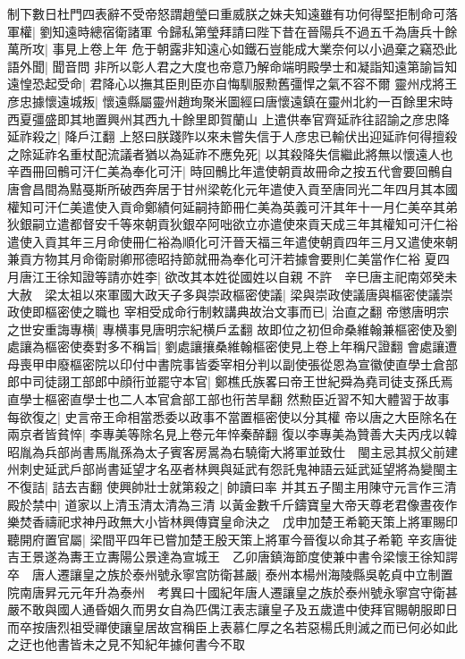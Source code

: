 制下數日杜門四表辭不受帝怒謂趙瑩曰重威朕之妹夫知遠雖有功何得堅拒制命可落軍權|{
	劉知遠時總宿衛諸軍}
令歸私第瑩拜請曰陛下昔在晉陽兵不過五千為唐兵十餘萬所攻|{
	事見上卷上年}
危于朝露非知遠心如鐵石豈能成大業奈何以小過棄之竊恐此語外聞|{
	聞音問}
非所以彰人君之大度也帝意乃解命端明殿學士和凝詣知遠第諭旨知遠惶恐起受命|{
	君降心以撫其臣則臣亦自悔馴服勲舊彊悍之氣不容不爾}
靈州戍將王彦忠據懷遠城叛|{
	懷遠縣屬靈州趙珣聚米圖經曰唐懷遠鎮在靈州北約一百餘里宋時西夏彊盛即其地置興州其西九十餘里即賀蘭山}
上遣供奉官齊延祚往詔諭之彦忠降延祚殺之|{
	降戶江翻}
上怒曰朕踐阼以來未嘗失信于人彦忠已輸伏出迎延祚何得擅殺之除延祚名重杖配流議者猶以為延祚不應免死|{
	以其殺降失信繼此將無以懷遠人也}
辛酉冊回鶻可汗仁美為奉化可汗|{
	時回鶻比年遣使朝貢故冊命之按五代會要回鶻自唐會昌間為黠戞斯所破西奔居于甘州梁乾化元年遣使入貢至唐同光二年四月其本國權知可汗仁美遣使入貢命鄭績何延嗣持節冊仁美為英義可汗其年十一月仁美卒其弟狄銀嗣立遣都督安千等來朝貢狄銀卒阿咄欲立亦遣使來貢天成三年其權知可汗仁裕遣使入貢其年三月命使冊仁裕為順化可汗晉天福三年遣使朝貢四年三月又遣使來朝兼貢方物其月命衛尉卿邢德昭持節就冊為奉化可汗若據會要則仁美當作仁裕}
夏四月唐江王徐知證等請亦姓李|{
	欲改其本姓從國姓以自親}
不許　辛巳唐主祀南郊癸未大赦　梁太祖以來軍國大政天子多與崇政樞密使議|{
	梁與崇政使議唐與樞密使議崇政使即樞密使之職也}
宰相受成命行制敕講典故治文事而已|{
	治直之翻}
帝懲唐明宗之世安重誨專横|{
	專横事見唐明宗紀横戶孟翻}
故即位之初但命桑維翰兼樞密使及劉處讓為樞密使奏對多不稱旨|{
	劉處讓攘桑維翰樞密使見上卷上年稱尺證翻}
會處讓遭母喪甲申廢樞密院以印付中書院事皆委宰相分判以副使張從恩為宣徽使直學士倉部郎中司徒詡工部郎中顔衎並罷守本官|{
	鄭樵氏族畧曰帝王世紀舜為堯司徒支孫氏焉直學士樞密直學士也二人本官倉部工部也衎苦旱翻}
然勲臣近習不知大體習于故事每欲復之|{
	史言帝王命相當悉委以政事不當置樞密使以分其權}
帝以唐之大臣除名在兩京者皆貧悴|{
	李專美等除名見上卷元年悴秦醉翻}
復以李專美為贊善大夫丙戌以韓昭胤為兵部尚書馬胤孫為太子賓客房暠為右驍衛大將軍並致仕　閩主忌其叔父前建州刺史延武戶部尚書延望才名巫者林興與延武有怨託鬼神語云延武延望將為變閩主不復詰|{
	詰去吉翻}
使興帥壯士就第殺之|{
	帥讀曰率}
并其五子閩主用陳守元言作三清殿於禁中|{
	道家以上清玉清太清為三清}
以黃金數千斤鑄寶皇大帝天尊老君像晝夜作樂焚香禱祀求神丹政無大小皆林興傳寶皇命決之　戊申加楚王希範天策上將軍賜印聽開府置官屬|{
	梁間平四年已嘗加楚王殷天策上將軍今晉復以命其子希範}
辛亥唐徙吉王景遂為夀王立夀陽公景達為宣城王　乙卯唐鎮海節度使兼中書令梁懷王徐知諤卒　唐人遷讓皇之族於泰州號永寧宫防衛甚嚴|{
	泰州本楊州海陵縣吳乾貞中立制置院南唐昇元元年升為泰州　考異曰十國紀年唐人遷讓皇之族於泰州號永寧宫守衛甚嚴不敢與國人通昏姻久而男女自為匹偶江表志讓皇子及五歲遣中使拜官賜朝服即日而卒按唐烈祖受禪使讓皇居故宫稱臣上表慕仁厚之名若惡楊氏則滅之而已何必如此之迂也他書皆未之見不知紀年據何書今不取}
